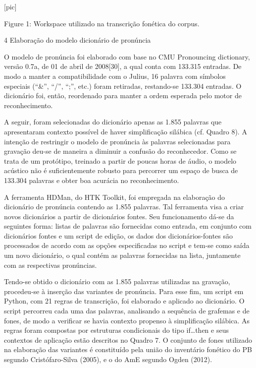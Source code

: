                                 [pic]

  Figure 1: Workspace utilizado na transcri\c{c}\~ao fon\'etica do corpus.

4 Elabora\c{c}\~ao do modelo dicion\'ario de pron\'uncia

O modelo de pron\'uncia foi elaborado com base no CMU Pronouncing
dictionary, vers\~ao 0.7a, de 01 de abril de 2008{[}30{]}, a qual conta
com 133.315 entradas. De modo a manter a compatibilidade com o Julius,
16 palavra com s\'imbolos especiais (``\&'', ``/'', ``;'', etc.) foram
retiradas, restando-se 133.304 entradas. O dicion\'ario foi, ent\~ao,
reordenado para manter a ordem esperada pelo motor de reconhecimento.

A seguir, foram selecionadas do dicion\'ario apenas as 1.855 palavras que
apresentaram contexto poss\'ivel de haver simplifica\c{c}\~ao sil\'abica (cf.
Quadro 8). A inten\c{c}\~ao de restringir o modelo de pron\'uncia às palavras
selecionadas para grava\c{c}\~ao deu-se de maneira a diminuir a confus\~ao do
reconhecedor. Como se trata de um prot\'otipo, treinado a partir de poucas
horas de \'audio, o modelo ac\'ustico n\~ao \'e suficientemente robusto para
percorrer um espa\c{c}o de busca de 133.304 palavras e obter boa acur\'acia no
reconhecimento.

A ferramenta HDMan, do HTK Toolkit, foi empregada na elabora\c{c}\~ao do
dicion\'ario de pron\'uncia contendo as 1.855 palavras. Tal ferramenta visa
a criar novos dicion\'arios a partir de dicion\'arios fontes. Seu
funcionamento d\'a-se da seguintes forma: listas de palavras s\~ao
fornecidas como entrada, em conjunto com dicion\'arios fontes e um script
de edi\c{c}\~ao, os dados dos dicion\'arios-fontes s\~ao processados de acordo com
as op\c{c}\~oes especificadas no script e tem-se como sa\'ida um novo
dicion\'ario, o qual cont\'em as palavras fornecidas na lista, juntamente
com as respectivas pron\'uncias.

Tendo-se obtido o dicion\'ario com as 1.855 palavras utilizadas na
grava\c{c}\~ao, procedeu-se à inser\c{c}\~ao das variantes de pron\'uncia. Para esse
fim, um script em Python, com 21 regras de transcri\c{c}\~ao, foi elaborado e
aplicado ao dicion\'ario. O script percorreu cada uma das palavras,
analisando a sequ\^encia de grafemas e de fones, de modo a verificar se
havia contexto propenso à simplifica\c{c}\~ao sil\'abica. As regras foram
compostas por estruturas condicionais do tipo if\ldots{}then e seus
contextos de aplica\c{c}\~ao est\~ao descritos no Quadro 7. O conjunto de fones
utilizado na elabora\c{c}\~ao das variantes \'e constitu\'ido pela uni\~ao do
invent\'ario fon\'etico do PB segundo Crist\'ofaro-Silva (2005), e o do AmE
segundo Ogden (2012).

